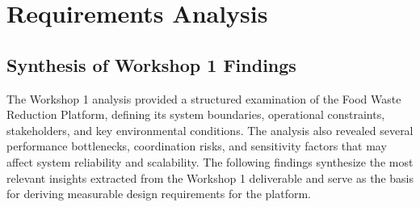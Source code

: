 \documentclass[12pt]{article}
\begin{document}
\section{Requirements Analysis}

\subsection{Synthesis of Workshop 1 Findings}
The Workshop 1 analysis provided a structured examination of the Food Waste Reduction Platform, defining its system boundaries, operational constraints, stakeholders, and key environmental conditions. The analysis also revealed several performance bottlenecks, coordination risks, and sensitivity factors that may affect system reliability and scalability. The following findings synthesize the most relevant insights extracted from the Workshop 1 deliverable and serve as the basis for deriving measurable design requirements for the platform.
\end{document}
